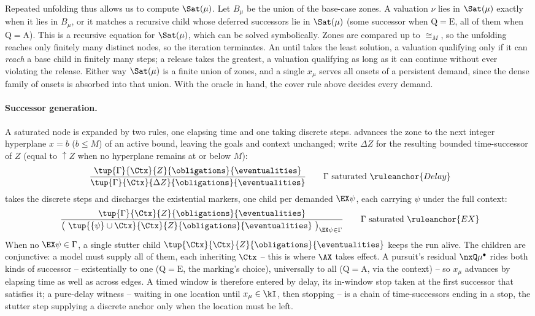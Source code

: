 Repeated unfolding thus allows us to compute $\Sat(\mu)$. Let $B_\mu$ be the union of the base-case zones. A valuation $\nu$ lies in $\Sat(\mu)$ exactly when it lies in $B_\mu$, or it matches a recursive child whose deferred successors lie in $\Sat(\mu)$ (some successor when $\mathrm{Q}=\mathrm{E}$, all of them when $\mathrm{Q}=\mathrm{A}$). This is a recursive equation for $\Sat(\mu)$, which can be solved symbolically. Zones are compared up to $\cong_M$, so the unfolding reaches only finitely many distinct nodes, so the iteration terminates.  An
until takes the least solution, a valuation qualifying only if it can \emph{reach} a base child in finitely
many steps; a release takes the greatest, a valuation qualifying as long as it can continue without ever
violating the release. Either way $\Sat(\mu)$ is a finite union of zones, and a single $x_\mu$ serves all
onsets of a persistent demand, since the dense family of onsets is absorbed into that union. With the
oracle in hand, the cover rule above decides every demand.


\paragraph{Successor generation.}
A saturated node is expanded by two rules, one elapsing time and one taking discrete steps.  advances the zone to the next integer hyperplane $x=b$ ($b\le M$) of an active bound, leaving the goals and context unchanged; write $\Delta Z$ for the resulting bounded time-successor of $Z$ (equal to $\uparrow Z$ when no hyperplane remains at or below $M$):
\[
 \ \frac{\tup{\Gamma}{\Ctx}{Z}{\obligations}{\eventualities}}
{\tup{\Gamma}{\Ctx}{\Delta Z}{\obligations}{\eventualities}}
\qquad \Gamma\ \text{saturated} \ \ruleanchor{Delay}
\]
 takes the discrete steps and discharges the existential markers, one child per demanded $\EX\psi$, each carrying $\psi$ under the full context:
\[
 \ \frac{\tup{\Gamma}{\Ctx}{Z}{\obligations}{\eventualities}}
{\big(\ \tup{\{\psi\}\cup\Ctx}{\Ctx}{Z}{\obligations}{\eventualities}\ \big)_{\EX\psi\in\Gamma}}
\qquad \Gamma\ \text{saturated} \ \ruleanchor{EX}
\]
When no $\EX\psi\in\Gamma$, a single {stutter} child $\tup{\Ctx}{\Ctx}{Z}{\obligations}{\eventualities}$ keeps the run alive. The children are conjunctive: a model must supply all of them, each inheriting $\Ctx$ -- this is where $\AX$ takes effect. A pursuit's residual $\nxQ\mu^\bullet$ rides {both} kinds of successor -- existentially to one ($\mathrm{Q}=\mathrm{E}$, the marking's choice), universally to all ($\mathrm{Q}=\mathrm{A}$, via the context) -- so $x_\mu$ advances by elapsing time as well as across edges. A timed window is therefore entered by delay, its in-window stop taken at the first successor that satisfies it; a pure-delay witness -- waiting in one location until $x_\mu\in\kI$, then stopping -- is a chain of time-successors ending in a stop, the stutter step supplying a discrete anchor only when the location must be left.

